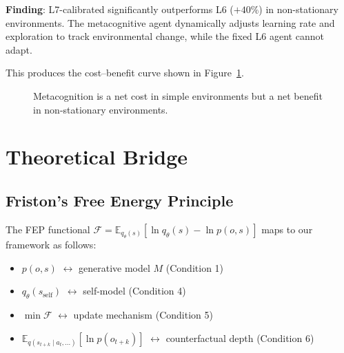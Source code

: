 \documentclass[11pt,a4paper]{article}
\begin{document}
\textbf{Finding}: L7-calibrated significantly outperforms L6 ($+40\%$) in non-stationary environments. The metacognitive agent dynamically adjusts learning rate and exploration to track environmental change, while the fixed L6 agent cannot adapt.

This produces the cost--benefit curve shown in Figure~\ref{fig:metacog-curve}.

\begin{figure}[h]
\centering
{}
\caption{Metacognition is a net cost in simple environments but a net benefit in non-stationary environments.}
\label{fig:metacog-curve}
\end{figure}

\section{Theoretical Bridge}

\subsection{Friston's Free Energy Principle}

The FEP functional $\mathcal{F} = \mathbb{E}_{q_\theta(s)}[\ln q_\theta(s) - \ln p(o,s)]$ maps to our framework as follows:

\begin{itemize}
    \item $p(o,s)$ $\leftrightarrow$ generative model $M$ (Condition 1)
    \item $q_\theta(s_{\text{self}})$ $\leftrightarrow$ self-model (Condition 4)
    \item $\min \mathcal{F}$ $\leftrightarrow$ update mechanism (Condition 5)
    \item $\mathbb{E}_{q(s_{t+k} \mid a_t, \ldots)}[\ln p(o_{t+k})]$ $\leftrightarrow$ counterfactual depth (Condition 6)
\end{itemize}
\end{document}
